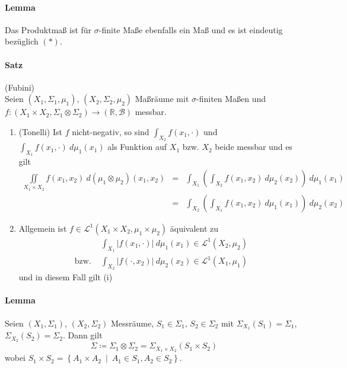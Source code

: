 \documentclass[12pt,a4paper,fleqn]{article}
\def\set#1{{\left\{ #1 \right\}}}
\def\Mid{\ \middle|\ }
\begin{document}
\paragraph{Lemma} Das Produktmaß ist für $\sigma$-finite Maße ebenfalls ein Maß und es ist eindeutig bezüglich $(*)$.

\paragraph{Satz} (Fubini)\\
Seien $(X_1, \Sigma_1, \mu_1)$, $(X_2, \Sigma_2, \mu_2)$ Maßräume mit $\sigma$-finiten Maßen und\linebreak ${f\colon (X_1 \times X_2, \Sigma_1 \otimes \Sigma_2) \rightarrow (\mathbb{R}, \mathcal{B})}$ messbar.
\begin{enumerate}
\item (Tonelli) Ist $f$ nicht-negativ, so sind $\int_{X_2} f(x_1, \cdot)$ und $\int_{X_1} f(x_1, \cdot )\ d\mu_1(x_1)$ als Funktion auf $X_1$ bzw. $X_2$ beide messbar und es gilt
\begin{align*}
\iint\limits_{X_1 \times X_2} f(x_1, x_2)\ d(\mu_1 \otimes \mu_2)(x_1, x_2) &=& \int_{X_1} \left(\int_{X_2} f(x_1, x_2)\ d\mu_2(x_2)\right)\ d\mu_1(x_1)\\
&=& \int_{X_2} \left(\int_{X_1} f(x_1, x_2)\ d\mu_1(x_1)\right)\ d\mu_2(x_2)
\end{align*}
\item Allgemein ist $f \in \mathscr{L}^1(X_1 \times X_2, \mu_1 \times \mu_2)$ äquivalent zu
\begin{align*}
&\int_{X_1} \vert f(x_1, \cdot) \vert\ d\mu_1(x_1) \in \mathscr{L}^1(X_2, \mu_2)\\
\text{bzw. } & \int_{X_2} \vert f(\cdot, x_2) \vert\ d\mu_2(x_2) \in \mathscr{L}^1(X_1, \mu_1)
\end{align*}
und in diesem Fall gilt (i)
\end{enumerate}

\paragraph{Lemma} Seien $(X_1, \Sigma_1)$, $(X_2, \Sigma_2)$ Messräume, $S_1 \in \Sigma_1$, $S_2 \in \Sigma_2$ mit \mbox{$\Sigma_{X_1}(S_1) = \Sigma_1$}, $\Sigma_{X_2}(S_2) = \Sigma_2$. Dann gilt
\begin{displaymath}
\Sigma \coloneqq \Sigma_1 \otimes \Sigma_2 = \Sigma_{X_1 \times X_2}(S_1 \times S_2) 
\end{displaymath}
wobei $S_1 \times S_2 = \set{A_1 \times A_2 \Mid A_1 \in S_1, A_2 \in S_2}$.
\end{document}
